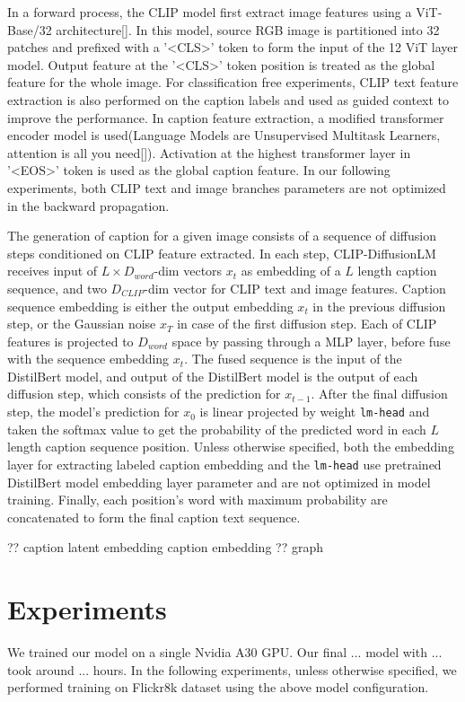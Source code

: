 \documentclass{article}
\begin{document}
In a forward process, the CLIP model first extract image features using a ViT-Base/32 architecture[]. In this model, source RGB image is partitioned into 32 patches and prefixed with a '<CLS>' token to form the input of the 12 ViT layer model. Output feature at the '<CLS>' token position is treated as the global feature for the whole image. For classification free experiments{}, CLIP text feature extraction is also performed on the caption labels and used as guided context to improve the performance. In caption feature extraction, a modified transformer encoder model is used(Language Models are Unsupervised Multitask Learners, attention is all you need[]). Activation at the highest transformer layer in '<EOS>' token is used as the global caption feature. In our following experiments, both CLIP text and image branches parameters are not optimized in the backward propagation.

The generation of caption for a given image consists of a sequence of diffusion steps conditioned on CLIP feature extracted. In each step, CLIP-DiffusionLM receives input of $L \times D_{word}$-dim vectors $x_t$ as embedding of a $L$ length caption sequence, and two $D_{CLIP}$-dim vector for CLIP text and image features. Caption sequence embedding is either the output embedding $x_t$ in the previous diffusion step, or the Gaussian noise $x_T$ in case of the first diffusion step. Each of CLIP features is projected to $D_{word}$ space by passing through a MLP layer, before fuse{} with the sequence embedding $x_t$. The fused sequence is the input of the DistilBert model, and output of the DistilBert model is the output of each diffusion step, which consists of the prediction for $x_{t-1}$. After the final diffusion step, the model's prediction for $x_0$ is linear projected by weight \texttt{lm-head} and taken the softmax value to get the probability of the predicted word in each $L$ length caption sequence position. Unless otherwise specified, both the embedding layer for extracting labeled caption embedding and the \texttt{lm-head} use pretrained DistilBert model embedding layer parameter and are not optimized in model training{}. Finally, each position's word with maximum probability are concatenated to form the final caption text sequence. 

?? caption latent embedding caption embedding
?? graph

\section{Experiments}
We trained our model on a single Nvidia A30 GPU. Our final ... model with ... took around ... hours. In the following experiments, unless otherwise specified, we performed training on Flickr8k dataset using the above model configuration. 
\end{document}
